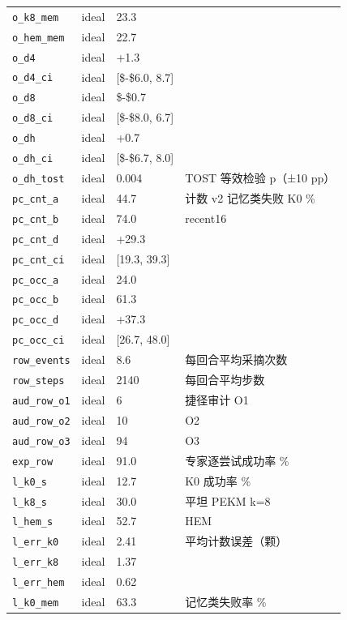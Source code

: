 \begin{longtable}{p{3.2cm}p{0.9cm}p{4.2cm}p{6.2cm}}
\texttt{o\_k8\_mem} & ideal & 23.3 & \\
\texttt{o\_hem\_mem} & ideal & 22.7 & \\
\texttt{o\_d4} & ideal & +1.3 & \\
\texttt{o\_d4\_ci} & ideal & [\$-\$6.0, 8.7] & \\
\texttt{o\_d8} & ideal & \$-\$0.7 & \\
\texttt{o\_d8\_ci} & ideal & [\$-\$8.0, 6.7] & \\
\texttt{o\_dh} & ideal & +0.7 & \\
\texttt{o\_dh\_ci} & ideal & [\$-\$6.7, 8.0] & \\
\texttt{o\_dh\_tost} & ideal & 0.004 & TOST 等效检验 p（±10 pp）\\
\texttt{pc\_cnt\_a} & ideal & 44.7 & 计数 v2 记忆类失败 K0 \%\\
\texttt{pc\_cnt\_b} & ideal & 74.0 & recent16\\
\texttt{pc\_cnt\_d} & ideal & +29.3 & \\
\texttt{pc\_cnt\_ci} & ideal & [19.3, 39.3] & \\
\texttt{pc\_occ\_a} & ideal & 24.0 & \\
\texttt{pc\_occ\_b} & ideal & 61.3 & \\
\texttt{pc\_occ\_d} & ideal & +37.3 & \\
\texttt{pc\_occ\_ci} & ideal & [26.7, 48.0] & \\
\texttt{row\_events} & ideal & 8.6 & 每回合平均采摘次数\\
\texttt{row\_steps} & ideal & 2140 & 每回合平均步数\\
\texttt{aud\_row\_o1} & ideal & 6 & 捷径审计 O1\\
\texttt{aud\_row\_o2} & ideal & 10 & O2\\
\texttt{aud\_row\_o3} & ideal & 94 & O3\\
\texttt{exp\_row} & ideal & 91.0 & 专家逐尝试成功率 \%\\
\texttt{l\_k0\_s} & ideal & 12.7 & K0 成功率 \%\\
\texttt{l\_k8\_s} & ideal & 30.0 & 平坦 PEKM k=8\\
\texttt{l\_hem\_s} & ideal & 52.7 & HEM\\
\texttt{l\_err\_k0} & ideal & 2.41 & 平均计数误差（颗）\\
\texttt{l\_err\_k8} & ideal & 1.37 & \\
\texttt{l\_err\_hem} & ideal & 0.62 & \\
\texttt{l\_k0\_mem} & ideal & 63.3 & 记忆类失败率 \%\\

\end{longtable}
